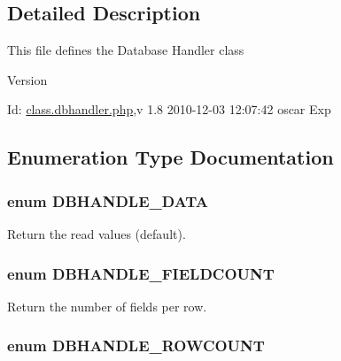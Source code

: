 \subsection{Detailed Description}
This file defines the Database Handler class \begin{DoxyVersion}{Version}

\end{DoxyVersion}
\begin{DoxyParagraph}{Id:}
\hyperlink{class_8dbhandler_8php}{class.dbhandler.php},v 1.8 2010-\/12-\/03 12:07:42 oscar Exp 
\end{DoxyParagraph}


\subsection{Enumeration Type Documentation}
\subsubsection[{DBHANDLE\_\-DATA}]{\setlength{\rightskip}{0pt plus 5cm}enum {\bf DBHANDLE\_\-DATA}}\label{class_8dbhandler_8php_acc5178c2a582eafa4ef488ed3394b725}


Return the read values (default). 

\subsubsection[{DBHANDLE\_\-FIELDCOUNT}]{\setlength{\rightskip}{0pt plus 5cm}enum {\bf DBHANDLE\_\-FIELDCOUNT}}\label{class_8dbhandler_8php_afda554c4527b03446f287291626c12ad}


Return the number of fields per row. 

\subsubsection[{DBHANDLE\_\-ROWCOUNT}]{\setlength{\rightskip}{0pt plus 5cm}enum {\bf DBHANDLE\_\-ROWCOUNT}}\label{class_8dbhandler_8php_ac904f05455a162c07c216c330ad7c5c6}



